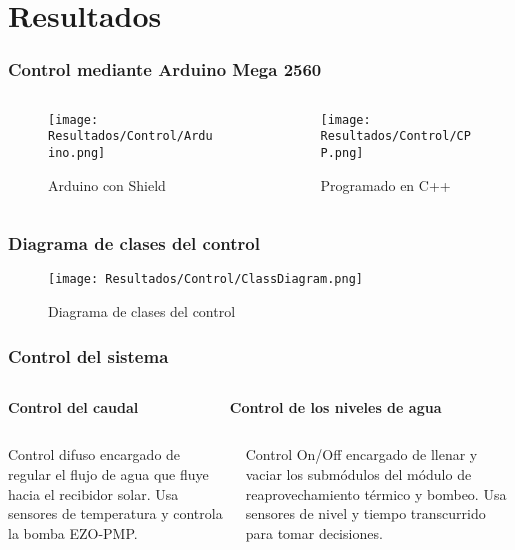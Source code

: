 \section{Resultados}
\begin{frame}
	\frametitle{Control mediante Arduino Mega 2560}
	\begin{columns}
		\begin{column}{0.5\linewidth}
			\begin{figure}
				\centering
				\texttt{[image: Resultados/Control/Arduino.png]}
				\caption{Arduino con Shield}
			\end{figure}
		\end{column}
		\begin{column}{0.5\linewidth}
			\begin{figure}
				\centering
				\texttt{[image: Resultados/Control/CPP.png]}
				\caption{Programado en C++}
			\end{figure}
		\end{column}
	\end{columns}
		
\end{frame}

\begin{frame}
	\frametitle{Diagrama de clases del control}
	
	\begin{figure}
		\centering
		\texttt{[image: Resultados/Control/ClassDiagram.png]}
		\caption{Diagrama de clases del control}
	\end{figure}
\end{frame}

\begin{frame}
	\frametitle{Control del sistema}
	\begin{columns}
		\begin{column}{0.5\linewidth}
			\textbf{Control del caudal}
		\end{column}
		\begin{column}{0.5\linewidth}
			\textbf{Control de los niveles de agua}
		\end{column}
	\end{columns}
	\vspace*{2mm}
	\begin{columns}
		\begin{column}{0.5\linewidth}
			Control difuso encargado de regular el flujo de agua que fluye hacia el recibidor solar. Usa sensores de temperatura y controla la bomba EZO-PMP.
		\end{column}
		\begin{column}{0.5\linewidth}
			Control On/Off encargado de llenar y vaciar los submódulos del módulo de reaprovechamiento térmico y bombeo. Usa sensores de nivel y tiempo transcurrido para tomar decisiones.
		\end{column}
	\end{columns}
\end{frame}

